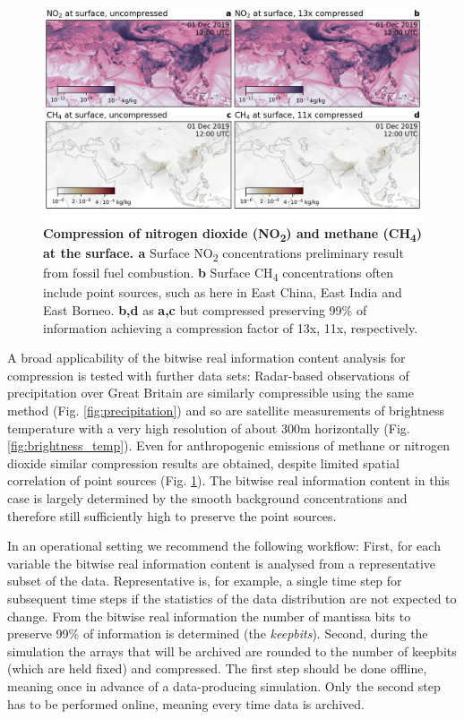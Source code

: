 \begin{figure}[tbhp]
	\includegraphics[width=1\textwidth]{Figures/compression/methane_no2_surface.png}
	\caption{\textbf{Compression of nitrogen dioxide (NO\textsubscript{2}) and methane (CH\textsubscript{4}) at the surface. a}
	Surface NO\textsubscript{2} concentrations preliminary result from fossil fuel combustion. \textbf{b} Surface CH\textsubscript{4}
	concentrations often include point sources, such as here in East China, East India and East Borneo. 
	\textbf{b,d} as \textbf{a,c} but compressed preserving 99\% of information achieving a compression factor of 13x, 11x,
	respectively.}
	\label{fig:methane_no2}
\end{figure}


A broad applicability of the bitwise real information content analysis for compression is tested with further data sets:
Radar-based observations of precipitation over Great Britain are similarly compressible using the same method
(Fig. \ref{fig:precipitation}) and so are satellite measurements of brightness temperature with a very high resolution
of about 300m horizontally (Fig. \ref{fig:brightness_temp}). Even for anthropogenic emissions of methane or nitrogen
dioxide similar compression results are obtained, despite limited spatial correlation of point sources (Fig. \ref{fig:methane_no2}).
The bitwise real information content in this case is largely determined by the smooth background concentrations and
therefore still sufficiently high to preserve the point sources. 

In an operational setting we recommend the following workflow: First, for each variable the bitwise real information
content is analysed from a representative subset of the data. Representative is, for example, a single time step for
subsequent time steps if the statistics of the data distribution are not expected to change. From the bitwise real information
the number of mantissa bits to preserve 99\% of information is determined  (the \emph{keepbits}). Second, during the simulation the
arrays that will be archived are rounded to the number of keepbits (which are held fixed) and compressed. The first step
should be done offline, meaning once in advance of a data-producing simulation. Only the second step has to be performed
online, meaning every time data is archived. 

